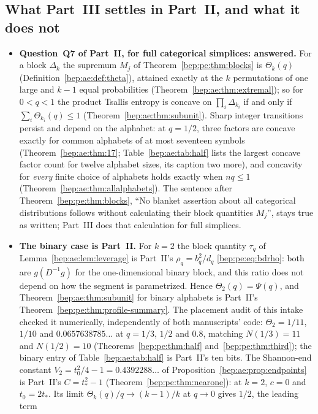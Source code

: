 \documentclass[11pt]{article}
\numberwithin{equation}{section}
\theoremstyle{definition}
\theoremstyle{remark}
\begin{document}
\subsection{What Part~III settles in Part~II, and what it does not}
\label{bep:ae:sec:settles}
\begin{itemize}
\item \textbf{Question~Q7 of Part~II, for full categorical simplices:
answered.} For a block $\Delta_k$ the supremum $M_j$ of
Theorem~\ref{bep:pe:thm:blocks} is $\Theta_k(q)$
(Definition~\ref{bep:ae:def:theta}), attained exactly at the $k$
permutations of one large and $k-1$ equal probabilities
(Theorem~\ref{bep:ae:thm:extremal}); so for $0<q<1$ the product Tsallis
entropy is concave on $\prod_i\Delta_{k_i}$ if and only if
$\sum_i\Theta_{k_i}(q)\leq1$ (Theorem~\ref{bep:ae:thm:subunit}). Sharp
integer transitions persist and depend on the alphabet: at $q=1/2$,
three factors are concave exactly for common alphabets of at most
seventeen symbols (Theorem~\ref{bep:ae:thm:17}; Table~\ref{bep:ae:tab:half}
lists the largest concave factor count for twelve alphabet sizes, its
caption two more), and
concavity for \emph{every} finite choice of alphabets holds exactly when
$nq\leq1$ (Theorem~\ref{bep:ae:thm:allalphabets}). The sentence after
Theorem~\ref{bep:pe:thm:blocks}, ``No blanket assertion about all
categorical distributions follows without calculating their block
quantities $M_j$'', stays true as written; Part~III does that
calculation for full simplices.
\item \textbf{The binary case is Part~II.} For $k=2$ the block quantity
$\tau_q$ of Lemma~\ref{bep:ae:lem:leverage} is Part~II's
$\rho_q=b_q^2/d_q$ \eqref{bep:pe:eq:bdrho}: both are $g(D^{-1}g)$ for the
one-dimensional binary block, and this ratio does not depend on how the
segment is parametrized. Hence $\Theta_2(q)=\Psi(q)$, and
Theorem~\ref{bep:ae:thm:subunit} for binary alphabets is Part~II's
Theorem~\ref{bep:pe:thm:profile-summary}. The placement audit of
this intake checked it numerically, independently of both manuscripts'
code: $\Theta_2=1/11$,
$1/10$ and $0.0657638785\ldots$ at $q=1/3$, $1/2$ and $0.8$, matching
$N(1/3)=11$ and $N(1/2)=10$ (Theorems~\ref{bep:pe:thm:half}
and~\ref{bep:pe:thm:third}); the binary entry of
Table~\ref{bep:ae:tab:half} is Part~II's ten bits. The Shannon-end
constant $V_2=t_0^2/4-1=0.4392288\ldots$ of
Proposition~\ref{bep:ae:prop:endpoints} is Part~II's $C=t_*^2-1$
(Theorem~\ref{bep:pe:thm:nearone}): at $k=2$, $c=0$ and $t_0=2t_*$. Its
limit $\Theta_k(q)/q\to(k-1)/k$ at $q\to0$ gives $1/2$, the leading term

\end{itemize}
\end{document}
